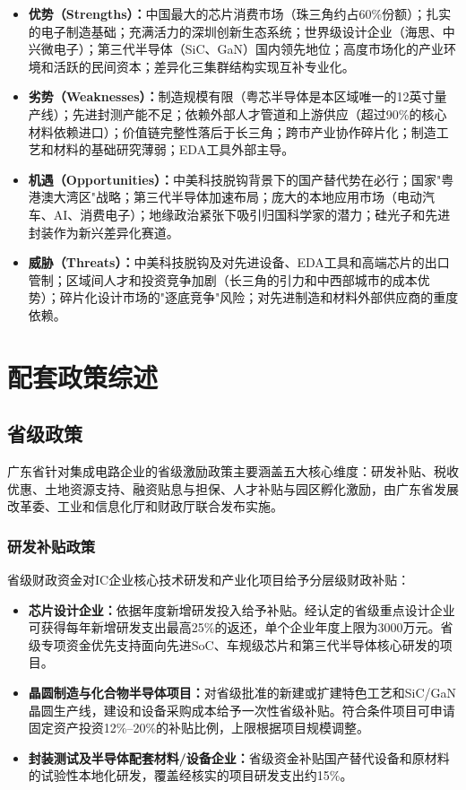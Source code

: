\documentclass[12pt,a4paper]{article}
\begin{document}
\begin{itemize}
    \item \textbf{优势（Strengths）：}中国最大的芯片消费市场（珠三角约占60\%份额）；扎实的电子制造基础；充满活力的深圳创新生态系统；世界级设计企业（海思、中兴微电子）；第三代半导体（SiC、GaN）国内领先地位；高度市场化的产业环境和活跃的民间资本；差异化三集群结构实现互补专业化。
    \item \textbf{劣势（Weaknesses）：}制造规模有限（粤芯半导体是本区域唯一的12英寸量产线）；先进封测产能不足；依赖外部人才管道和上游供应（超过90\%的核心材料依赖进口）；价值链完整性落后于长三角；跨市产业协作碎片化；制造工艺和材料的基础研究薄弱；EDA工具外部主导。
    \item \textbf{机遇（Opportunities）：}中美科技脱钩背景下的国产替代势在必行；国家"粤港澳大湾区"战略；第三代半导体加速布局；庞大的本地应用市场（电动汽车、AI、消费电子）；地缘政治紧张下吸引归国科学家的潜力；硅光子和先进封装作为新兴差异化赛道。
    \item \textbf{威胁（Threats）：}中美科技脱钩及对先进设备、EDA工具和高端芯片的出口管制；区域间人才和投资竞争加剧（长三角的引力和中西部城市的成本优势）；碎片化设计市场的"逐底竞争"风险；对先进制造和材料外部供应商的重度依赖。
\end{itemize}

\section{配套政策综述}
\label{sec:policy}

\subsection{省级政策}
\label{sec:provincial_policy}

广东省针对集成电路企业的省级激励政策主要涵盖五大核心维度：研发补贴、税收优惠、土地资源支持、融资贴息与担保、人才补贴与园区孵化激励，由广东省发展改革委、工业和信息化厅和财政厅联合发布实施。

\subsubsection{研发补贴政策}

省级财政资金对IC企业核心技术研发和产业化项目给予分层级财政补贴：

\begin{itemize}
    \item \textbf{芯片设计企业：}依据年度新增研发投入给予补贴。经认定的省级重点设计企业可获得每年新增研发支出最高25\%的返还，单个企业年度上限为3000万元。省级专项资金优先支持面向先进SoC、车规级芯片和第三代半导体核心研发的项目。
    \item \textbf{晶圆制造与化合物半导体项目：}对省级批准的新建或扩建特色工艺和SiC/GaN晶圆生产线，建设和设备采购成本给予一次性省级补贴。符合条件项目可申请固定资产投资12\%--20\%的补贴比例，上限根据项目规模调整。
    \item \textbf{封装测试及半导体配套材料/设备企业：}省级资金补贴国产替代设备和原材料的试验性本地化研发，覆盖经核实的项目研发支出约15\%。
\end{itemize}
\end{document}
